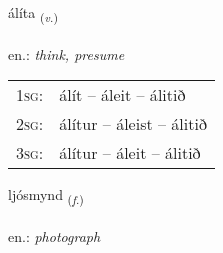 \documentclass[frontgrid, backgrid]{flacards}\usepackage[]{graphicx}\usepackage[]{xcolor}
\begin{document}
\renewcommand{\flhead}{\vskip5pt \fboxsep=0pt {\small\bfseries\footnotesize Sagnorð | Verb}}
\renewcommand{\fcfoot}{\vskip5pt \fboxsep=0pt \hspace{2pt}{\small\bfseries\footnotesize 2K}}

\renewcommand{\blhead}{\vskip5pt {\small\bfseries\footnotesize Sagnorð | Verb }}
\renewcommand{\bcfoot}{\vskip5pt \hspace{2pt}{\small\bfseries\footnotesize 2K}}


{álíta \small{\textsubscript{(\textit{v.})}} \\[1ex] %
\textphonetic{[auːlita]} \\
en.: \emph{think, presume} \\  [2ex]
\renewcommand*{\arraystretch}{0.8}
\begin{tabular}{p{1cm}l}
\textsc{1sg}: & álít -- áleit -- álitið \\ 
\textsc{2sg}: & álítur -- áleist -- álitið \\ 
\textsc{3sg}: & álítur -- áleit -- álitið \\ 
\end{tabular}
}

\renewcommand{\flhead}{\vskip5pt \fboxsep=0pt {\small\bfseries\footnotesize Nafnorð | Noun}}
\renewcommand{\fcfoot}{\vskip5pt \fboxsep=0pt \hspace{2pt}{\small\bfseries\footnotesize 2K}}

\renewcommand{\blhead}{\vskip5pt {\small\bfseries\footnotesize Nafnorð | Noun }}
\renewcommand{\bcfoot}{\vskip5pt \hspace{2pt}{\small\bfseries\footnotesize 2K}}


{ljósmynd \small{\textsubscript{(\textit{f.})}} \\[1ex] %
\textphonetic{[ljousmɪnt]} \\
en.: \emph{photograph} \\  [2ex]
\renewcommand*{\arraystretch}{0.8}
}
\end{document}
